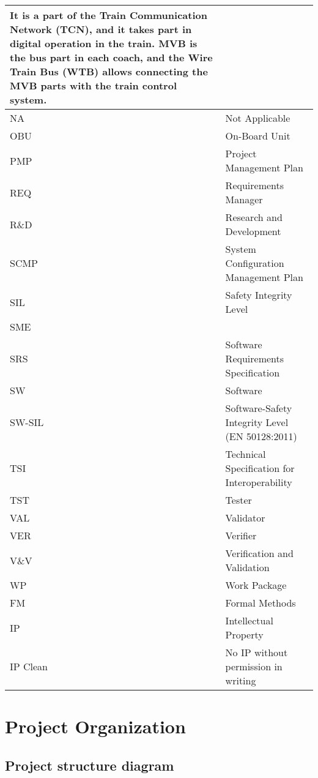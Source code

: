 \documentclass{template/openetcs_article}
\begin{document}
\begin{supertabular}{|m{3cm}m{11cm}|}
It is a part of the Train Communication Network (TCN), and it takes part in digital operation in the train. MVB is the bus part in each coach, and the Wire Train Bus (WTB) allows connecting the MVB parts with the train control system.\\\hline
NA &
Not Applicable\\\hline
OBU &
On-Board Unit\\\hline
PMP &
Project Management Plan\\\hline
REQ &
Requirements Manager\\\hline
R\&D &
Research and Development\\\hline
SCMP &
System Configuration Management Plan\\\hline
SIL &
Safety Integrity Level\\\hline
SME &
~
\\\hline
SRS &
Software Requirements Specification\\\hline
SW &
Software\\\hline
SW-SIL &
Software-Safety Integrity Level (EN 50128:2011)\\\hline
TSI &
Technical Specification for Interoperability\\\hline
TST &
Tester\\\hline
VAL &
Validator\\\hline
VER &
Verifier\\\hline
V\&V &
Verification and Validation\\\hline
WP &
Work Package\\\hline
FM &
Formal Methods\\\hline
IP &
Intellectual Property\\\hline
IP Clean &
No IP without permission in writing \\\hline
\end{supertabular}

\section{Project Organization}



\subsection{Project structure diagram}
\end{document}
